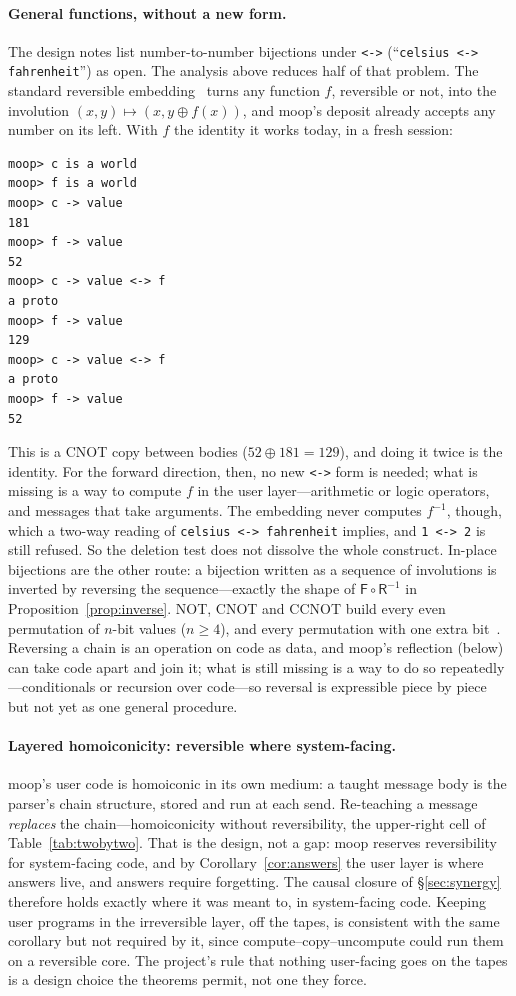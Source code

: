 \documentclass[11pt]{article}
\theoremstyle{definition}
\theoremstyle{remark}
\newcommand{\moop}{\textsf{moop}}
\newcommand{\code}[1]{\texttt{#1}}
\newcommand{\xor}{\oplus}
\begin{document}
\paragraph{General functions, without a new form.}
The design notes list number-to-number bijections under \code{<->}
(``\code{celsius <-> fahrenheit}'') as open. The analysis above
reduces half of that problem. The standard reversible
embedding~\cite{toffoli1980,bennett1973} turns any function $f$,
reversible or not, into the involution $(x,y)\mapsto(x,y\xor f(x))$, and
\moop{}'s deposit already accepts any number on its left. With $f$ the
identity it works today, in a fresh session:
\begin{Verbatim}[fontsize=\small,xleftmargin=2em]
moop> c is a world
moop> f is a world
moop> c -> value
181
moop> f -> value
52
moop> c -> value <-> f
a proto
moop> f -> value
129
moop> c -> value <-> f
a proto
moop> f -> value
52
\end{Verbatim}
This is a CNOT copy between bodies ($52\xor181=129$), and doing it twice
is the identity. For the forward direction, then, no new \code{<->}
form is needed; what is missing is a way to compute $f$ in the user
layer---arithmetic or logic operators, and messages that take
arguments. The embedding never computes $f^{-1}$, though, which a
two-way reading of \code{celsius <-> fahrenheit} implies, and
\code{1 <-> 2} is still refused. So the deletion test does not
dissolve the whole construct. In-place bijections are the other route: a
bijection written as a sequence of involutions is inverted by reversing
the sequence---exactly the shape of $\textsf{F}\circ\textsf{R}^{-1}$ in
Proposition~\ref{prop:inverse}. NOT, CNOT and CCNOT build every even
permutation of $n$-bit values ($n\ge4$), and every permutation with one
extra bit~\cite{shende2003}. Reversing a
chain is an operation on code as data, and \moop{}'s reflection (below)
can take code apart and join it; what is still missing is a way to do
so repeatedly---conditionals or recursion over code---so reversal is
expressible piece by piece but not yet as one general procedure.

\paragraph{Layered homoiconicity: reversible where system-facing.}
\moop{}'s user code is homoiconic in its own medium: a taught message
body is the parser's chain structure, stored and run at each send.
Re-teaching a message \emph{replaces} the chain---homoiconicity without
reversibility, the upper-right cell of Table~\ref{tab:twobytwo}. That is
the design, not a gap: \moop{} reserves reversibility for system-facing
code, and by Corollary~\ref{cor:answers} the user layer is where answers
live, and answers require forgetting. The causal closure of
\S\ref{sec:synergy} therefore holds exactly where it was meant to, in
system-facing code. Keeping user
programs in the irreversible layer, off the tapes, is consistent with the
same corollary but not required by it, since compute--copy--uncompute
could run them on a reversible core. The project's rule that nothing
user-facing goes on the tapes is a design choice the theorems permit,
not one they force.
\end{document}
